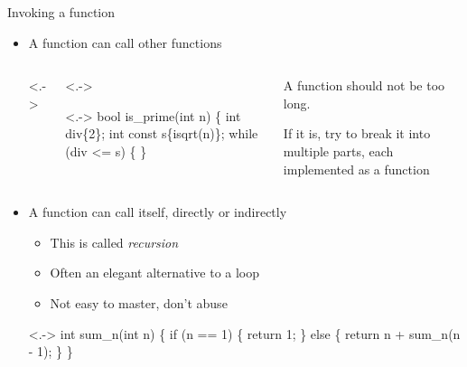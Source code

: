 \begin{frame}[fragile]{Invoking a function \insertcontinuationtext}

  \begin{itemize}[<+->]

  \item A function can call other functions

    \begin{columns}<.->
      \begin{column}{.5\linewidth}<.->
        \begin{codeblock}<.->{
bool is_prime(int n) \{
  \ddd
  int div\{2\};
  int const s\{\alert{isqrt}(n)\};
  while (div <= s) \{
  \ddd
\}}\end{codeblock}
        
      \end{column}
      \begin{column}{.5\textwidth}
        A function should not be too long.

        If it is, try to break it into multiple parts, each implemented as a
        function
      \end{column}
    \end{columns}

  \item A function can call itself, directly or indirectly
    \begin{itemize}[<.->]
    \item This is called \textit{recursion}
    \item Often an elegant alternative to a loop
    \item Not easy to master, don't abuse
    \end{itemize}

    \begin{codeblock}<.->{
int \alert{sum_n}(int n) \{
  if (n == 1) \{
    return 1;
  \} else \{
    return n + \alert{sum_n}(n - 1);
  \}
\}}\end{codeblock}

  \end{itemize}

\end{frame}

